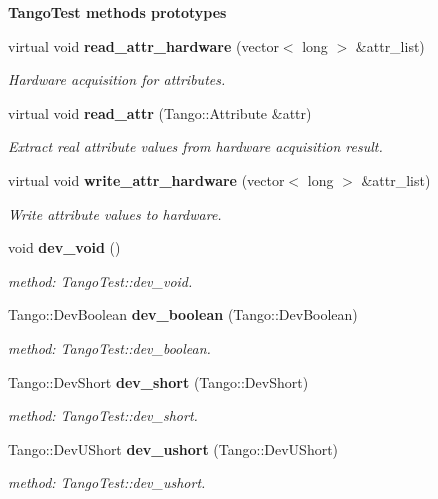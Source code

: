 \begin{Indent}{\bf Tango\-Test methods prototypes}\par
\begin{CompactItemize}
\item 
virtual void {\bf read\_\-attr\_\-hardware} (vector$<$ long $>$ \&attr\_\-list)
\begin{CompactList}\small\item\em Hardware acquisition for attributes.\item\end{CompactList}\item 
virtual void {\bf read\_\-attr} (Tango::Attribute \&attr)
\begin{CompactList}\small\item\em Extract real attribute values from hardware acquisition result.\item\end{CompactList}\item 
virtual void {\bf write\_\-attr\_\-hardware} (vector$<$ long $>$ \&attr\_\-list)
\begin{CompactList}\small\item\em Write attribute values to hardware.\item\end{CompactList}\item 
void {\bf dev\_\-void} ()
\begin{CompactList}\small\item\em method: Tango\-Test::dev\_\-void.\item\end{CompactList}\item 
Tango::Dev\-Boolean {\bf dev\_\-boolean} (Tango::Dev\-Boolean)
\begin{CompactList}\small\item\em method: Tango\-Test::dev\_\-boolean.\item\end{CompactList}\item 
Tango::Dev\-Short {\bf dev\_\-short} (Tango::Dev\-Short)
\begin{CompactList}\small\item\em method: Tango\-Test::dev\_\-short.\item\end{CompactList}\item 
Tango::Dev\-UShort {\bf dev\_\-ushort} (Tango::Dev\-UShort)
\begin{CompactList}\small\item\em method: Tango\-Test::dev\_\-ushort.\item\end{CompactList}\item 

\end{CompactItemize}
\end{Indent}
